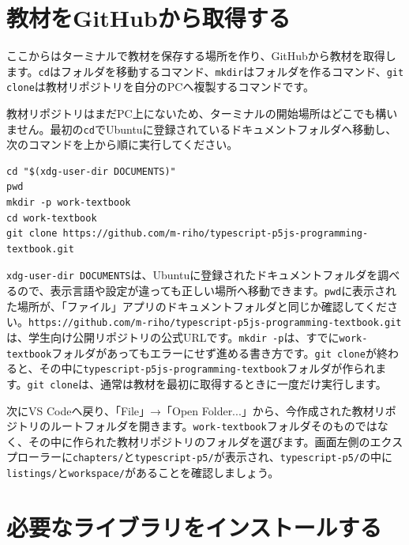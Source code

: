 \section{教材をGitHubから取得する}

ここからはターミナルで教材を保存する場所を作り、GitHubから教材を取得します。\texttt{cd}はフォルダを移動するコマンド、\texttt{mkdir}はフォルダを作るコマンド、\texttt{git clone}は教材リポジトリを自分のPCへ複製するコマンドです。

教材リポジトリはまだPC上にないため、ターミナルの開始場所はどこでも構いません。最初の\texttt{cd}でUbuntuに登録されているドキュメントフォルダへ移動し、次のコマンドを上から順に実行してください。

\begin{listing}[htbp]
\begin{verbatim}
cd "$(xdg-user-dir DOCUMENTS)"
pwd
mkdir -p work-textbook
cd work-textbook
git clone https://github.com/m-riho/typescript-p5js-programming-textbook.git
\end{verbatim}
\caption{教材を保存するフォルダを作成してリポジトリを取得するコマンド}
\label{lst:appendix-ubuntu-git-clone}
\end{listing}

\texttt{xdg-user-dir DOCUMENTS}は、Ubuntuに登録されたドキュメントフォルダを調べるので、表示言語や設定が違っても正しい場所へ移動できます。\texttt{pwd}に表示された場所が、「ファイル」アプリのドキュメントフォルダと同じか確認してください。\texttt{https://github.com/m-riho/typescript-p5js-programming-textbook.git}は、学生向け公開リポジトリの公式URLです。\texttt{mkdir -p}は、すでに\texttt{work-textbook}フォルダがあってもエラーにせず進める書き方です。\texttt{git clone}が終わると、その中に\texttt{typescript-p5js-programming-textbook}フォルダが作られます。\texttt{git clone}は、通常は教材を最初に取得するときに一度だけ実行します。

次にVS Codeへ戻り、「File」→「Open Folder...」から、今作成された教材リポジトリのルートフォルダを開きます。\texttt{work-textbook}フォルダそのものではなく、その中に作られた教材リポジトリのフォルダを選びます。画面左側のエクスプローラーに\texttt{chapters/}と\texttt{typescript-p5/}が表示され、\texttt{typescript-p5/}の中に\texttt{listings/}と\texttt{workspace/}があることを確認しましょう。

\section{必要なライブラリをインストールする}

